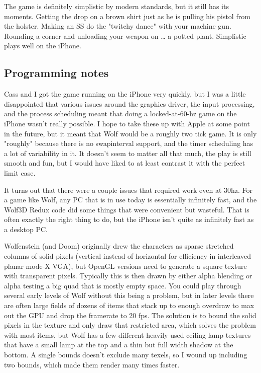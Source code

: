 \documentclass[book.tex]{subfiles}
\begin{document}
The game is definitely simplistic by modern standards, but it still has its moments.  Getting the drop on a brown shirt just as he is pulling his pistol from the holster.  Making an SS do the "twitchy dance" with your machine gun.  Rounding a corner and unloading your weapon on … a potted plant.  Simplistic plays well on the iPhone.\\
\par

\subsection{Programming notes}
Cass and I got the game running on the iPhone very quickly, but I was a little disappointed that various issues around the graphics driver, the input processing, and the process scheduling meant that doing a locked-at-60-hz game on the iPhone wasn't really possible.  I hope to take these up with Apple at some point in the future, but it meant that Wolf would be a roughly two tick game.  It is only "roughly" because there is no swapinterval support, and the timer scheduling has a lot of variability in it.  It doesn't seem to matter all that much, the play is still smooth and fun, but I would have liked to at least contrast it with the perfect limit case.\\
\par

It turns out that there were a couple issues that required work even at 30hz.  For a game like Wolf, any PC that is in use today is essentially infinitely fast, and the Wolf3D Redux code did some things that were convenient but wasteful.  That is often exactly the right thing to do, but the iPhone isn't quite as infinitely fast as a desktop PC.\\
\par

Wolfenstein (and Doom) originally drew the characters as sparse stretched columns of solid pixels (vertical instead of horizontal for efficiency in interleaved planar mode-X VGA), but OpenGL versions need to generate a square texture with transparent pixels.  Typically this is then drawn by either alpha blending or alpha testing a big quad that is mostly empty space.  You could play through several early levels of Wolf without this being a problem, but in later levels there are often large fields of dozens of items that stack up to enough overdraw to max out the GPU and drop the framerate to 20 fps.  The solution is to bound the solid pixels in the texture and only draw that restricted area, which solves the problem with most items, but Wolf has a few different heavily used ceiling lamp textures that have a small lamp at the top and a thin but full width shadow at the bottom.  A single bounds doesn't exclude many texels, so I wound up including two bounds, which made them render many times faster.\\
\par
\end{document}
